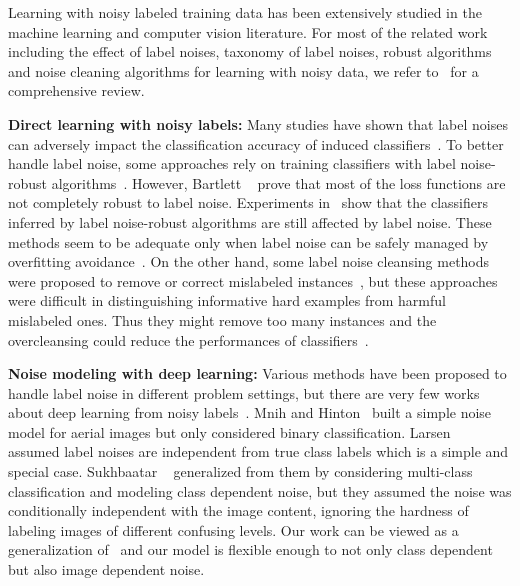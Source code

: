 Learning with noisy labeled training data has been extensively studied in the machine learning and computer vision literature. For most of the related work including the effect of label noises, taxonomy of label noises, robust algorithms and noise cleaning algorithms for learning with noisy data, we refer to~\cite{frenay2014classification} for a comprehensive review.

{\bf Direct learning with noisy labels:} Many studies have shown that label noises can adversely impact the classification accuracy of induced classifiers~\cite{zhu2004class,nettleton2010study,pechenizkiy2006class}. To better handle label noise, some approaches rely on training classifiers with label noise-robust algorithms~\cite{beigman2009learning,manwani2013noise}. However, Bartlett \etal~\cite{bartlett2006convexity} prove that most of the loss functions are not completely robust to label noise. Experiments in~\cite{teng2001comparison} show that the classifiers inferred by label noise-robust algorithms are still affected by label noise. These methods seem to be adequate only when label noise can be safely managed by overfitting avoidance~\cite{frenay2014classification}. On the other hand, some label noise cleansing methods were proposed to remove or correct mislabeled instances~\cite{barandela2000decontamination,brodley1999identifying,miranda2009use}, but these approaches were difficult in distinguishing informative hard examples from harmful mislabeled ones. Thus they might remove too many instances and the overcleansing could reduce the performances of classifiers~\cite{matic1992computer}.

{\bf Noise modeling with deep learning:} Various methods have been proposed to handle label noise in different problem settings, but there are very few works about deep learning from noisy labels~\cite{mnih2012learning, larsen1998design, sukhbaatar2014learning}. Mnih and Hinton~\cite{mnih2012learning} built a simple noise model for aerial images but only considered binary classification. Larsen \etal~\cite{larsen1998design} assumed label noises are independent from true class labels which is a simple and special case. Sukhbaatar \etal~\cite{sukhbaatar2014learning} generalized from them by considering multi-class classification and modeling class dependent noise, but they assumed the noise was conditionally independent with the image content, ignoring the hardness of labeling images of different confusing levels. Our work can be viewed as a generalization of~\cite{sukhbaatar2014learning,natarajan2013learning} and our model is flexible enough to not only class dependent but also image dependent noise.

